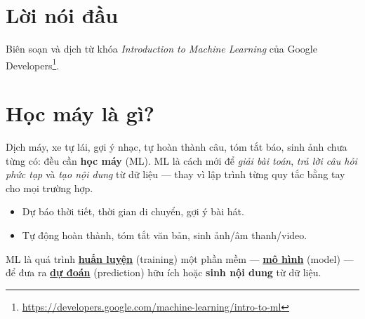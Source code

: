 \documentclass[12pt,a4paper]{article}
\begin{document}

\newpage
\tableofcontents
\newpage

\section*{Lời nói đầu}

\begin{ynghia}[title={Cách đọc tài liệu}]
Biên soạn và dịch từ khóa \emph{Introduction to Machine Learning} của Google Developers\footnote{\url{https://developers.google.com/machine-learning/intro-to-ml}}.
\end{ynghia}

\newpage

\section{Học máy là gì?}

\begin{dongco}[title={Tại sao cần học máy?}]
Dịch máy, xe tự lái, gợi ý nhạc, tự hoàn thành câu, tóm tắt báo, sinh ảnh chưa từng có: đều cần \textbf{học máy} (ML). ML là cách mới để \emph{giải bài toán}, \emph{trả lời câu hỏi phức tạp} và \emph{tạo nội dung} từ dữ liệu --- thay vì lập trình từng quy tắc bằng tay cho mọi trường hợp.
\end{dongco}

\begin{ungdung}
\begin{itemize}
  \item Dự báo thời tiết, thời gian di chuyển, gợi ý bài hát.
  \item Tự động hoàn thành, tóm tắt văn bản, sinh ảnh/âm thanh/video.
\end{itemize}
\end{ungdung}

\begin{dinhnghia}[title={Học máy}]
ML là quá trình
\href{https://developers.google.com/machine-learning/glossary\#training}{\textbf{huấn luyện}} (training) một phần mềm ---
\href{https://developers.google.com/machine-learning/glossary\#model}{\textbf{mô hình}} (model) ---
để đưa ra
\href{https://developers.google.com/machine-learning/glossary\#prediction}{\textbf{dự đoán}} (prediction) hữu ích hoặc \textbf{sinh nội dung} từ dữ liệu.
\end{dinhnghia}
\end{document}

